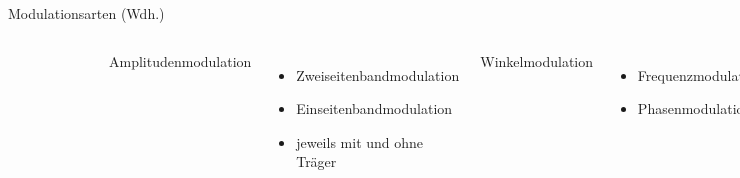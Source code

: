 \begin{frame}{Modulationsarten (Wdh.)}
  \begin{columns}[c]
    \begin{figure}
      \includegraphics[width=\textwidth,height=.80\textheight,keepaspectratio]{e14/modulationen.jpg}\\
    \end{figure}
    Amplitudenmodulation
    \begin{itemize}
      \item Zweiseitenbandmodulation
      \item Einseitenbandmodulation
      \item jeweils mit und ohne Träger
    \end{itemize}
    Winkelmodulation
    \begin{itemize}
      \item Frequenzmodulation
      \item Phasenmodulation
    \end{itemize}
  \end{columns}
\end{frame}



